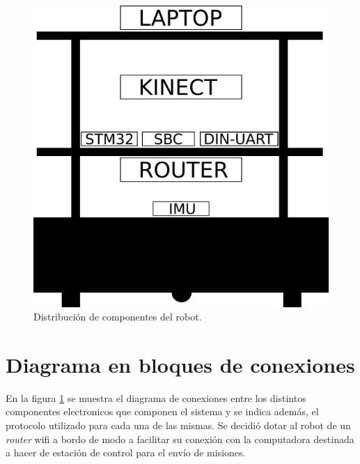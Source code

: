 \begin{figure}[ht]
    \centering
    \includegraphics[scale=0.4]{./Figures/distribucion_componentes.png}
    \caption{Distribución de componentes del robot.}
    \label{fig:lubobotComponentes}
\end{figure}

\section{Diagrama en bloques de conexiones}

En la figura \ref{fig:lubobotComponentes} se muestra el diagrama de conexiones entre los distintos componentes electronicos que componen el sistema y se indica además, el protocolo utilizado para cada una de las mismas. Se decidió dotar al robot de un \textit{router} wifi a bordo de modo a facilitar su conexión con la computadora destinada a hacer de estación de control para el envío de misiones.

